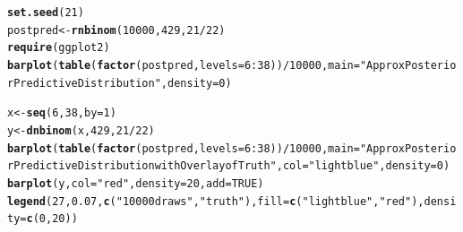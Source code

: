 \documentclass[12pt]{article}\usepackage[]{graphicx}\usepackage[]{color}
\makeatletter
\newcommand{\hlnum}[1]{\textcolor[rgb]{0.686,0.059,0.569}{#1}}%
\newcommand{\hlstr}[1]{\textcolor[rgb]{0.192,0.494,0.8}{#1}}%
\newcommand{\hlopt}[1]{\textcolor[rgb]{0,0,0}{#1}}%
\newcommand{\hlstd}[1]{\textcolor[rgb]{0.345,0.345,0.345}{#1}}%
\newcommand{\hlkwb}[1]{\textcolor[rgb]{0.69,0.353,0.396}{#1}}%
\newcommand{\hlkwc}[1]{\textcolor[rgb]{0.333,0.667,0.333}{#1}}%
\newcommand{\hlkwd}[1]{\textcolor[rgb]{0.737,0.353,0.396}{\textbf{#1}}}%
\newenvironment{kframe}{%
 \def\at@end@of@kframe{}%
 \ifinner\ifhmode%
  \def\at@end@of@kframe{\end{minipage}}%
  \begin{minipage}{\columnwidth}%
 \fi\fi%
 \def\FrameCommand##1{\hskip\@totalleftmargin \hskip-\fboxsep
 \colorbox{shadecolor}{##1}\hskip-\fboxsep
     \hskip-\linewidth \hskip-\@totalleftmargin \hskip\columnwidth}%
 \MakeFramed {\advance\hsize-\width
   \@totalleftmargin\z@ \linewidth\hsize
   \@setminipage}}%
 {\par\unskip\endMakeFramed%
 \at@end@of@kframe}
\newenvironment{knitrout}{}{} %
\makeatother
\begin{document}
\begin{knitrout}\footnotesize
{}\color{fgcolor}\begin{kframe}
\begin{alltt}
\hlkwd{set.seed}\hlstd{(}\hlnum{21}\hlstd{)}
\hlstd{postpred} \hlkwb{<-} \hlkwd{rnbinom}\hlstd{(}\hlnum{10000}\hlstd{,} \hlnum{429}\hlstd{,} \hlnum{21}\hlopt{/}\hlnum{22}\hlstd{)}
\hlkwd{require}\hlstd{(ggplot2)}
\hlkwd{barplot}\hlstd{(}\hlkwd{table}\hlstd{(}\hlkwd{factor}\hlstd{(postpred,} \hlkwc{levels} \hlstd{=} \hlnum{6}\hlopt{:}\hlnum{38}\hlstd{))}\hlopt{/}\hlnum{10000}\hlstd{,}  \hlkwc{main}\hlstd{=}\hlstr{"Approx Posterior Predictive Distribution"}\hlstd{,} \hlkwc{density}\hlstd{=}\hlnum{0}\hlstd{)}
\end{alltt}
\end{kframe}
\end{knitrout}

\begin{knitrout}\footnotesize
{}\color{fgcolor}\begin{kframe}
\begin{alltt}
\hlstd{x} \hlkwb{<-} \hlkwd{seq}\hlstd{(}\hlnum{6}\hlstd{,} \hlnum{38}\hlstd{,} \hlkwc{by}\hlstd{=}\hlnum{1}\hlstd{)}
\hlstd{y} \hlkwb{<-} \hlkwd{dnbinom}\hlstd{(x,} \hlnum{429}\hlstd{,} \hlnum{21}\hlopt{/}\hlnum{22}\hlstd{)}
\hlkwd{barplot}\hlstd{(}\hlkwd{table}\hlstd{(}\hlkwd{factor}\hlstd{(postpred,} \hlkwc{levels} \hlstd{=} \hlnum{6}\hlopt{:}\hlnum{38}\hlstd{))}\hlopt{/}\hlnum{10000}\hlstd{,}  \hlkwc{main}\hlstd{=}\hlstr{"Approx Posterior Predictive Distribution with Overlay of Truth"}\hlstd{,} \hlkwc{col}\hlstd{=}\hlstr{"lightblue"}\hlstd{,} \hlkwc{density}\hlstd{=}\hlnum{0}\hlstd{)}
\hlkwd{barplot}\hlstd{(y,} \hlkwc{col}\hlstd{=}\hlstr{"red"}\hlstd{,} \hlkwc{density}\hlstd{=}\hlnum{20}\hlstd{,}\hlkwc{add}\hlstd{=}\hlnum{TRUE}\hlstd{)}
\hlkwd{legend}\hlstd{(}\hlnum{27}\hlstd{,} \hlnum{0.07}\hlstd{,} \hlkwd{c}\hlstd{(}\hlstr{"10000 draws"}\hlstd{,} \hlstr{"truth"}\hlstd{),} \hlkwc{fill}\hlstd{=}\hlkwd{c}\hlstd{(}\hlstr{"lightblue"}\hlstd{,} \hlstr{"red"}\hlstd{),} \hlkwc{density}\hlstd{=}\hlkwd{c}\hlstd{(}\hlnum{0}\hlstd{,} \hlnum{20}\hlstd{))}
\end{alltt}
\end{kframe}
\end{knitrout}
\end{document}
